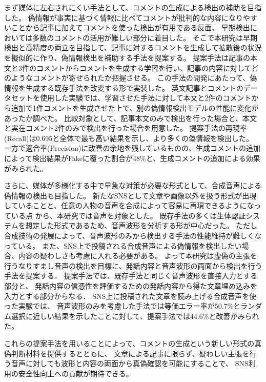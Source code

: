 まず媒体に左右されにくい手法として、コメントの生成による検出の補助を目指した。
偽情報が事実に基づく情報に比べてコメントが批判的な内容になりやすいことから記事に加えてコメントを使った検出が有用である反面、
早期検出においては多数のコメントの活用が難しい部分に着目した。
そこで本研究は早期検出と高精度の両立を目指して、記事に対するコメントを生成して拡散後の状況を擬似的に作り、偽情報検出を補助する手法を提案する。
提案手法は記事の本文と3件のコメントからコメントを生成する学習を行い、記事の内容に対してどのようなコメントが寄せられたか把握させる。
この手法の開発にあたって、偽情報を生成する既存手法を改変する形で実装した。
英文記事とコメントのデータセットを使用した実験では、学習させた手法に対して本文と2件のコメントから追加で1件コメントを生成させた上で、別の偽情報検出モデルの性能に変化があったか調べた。
比較対象として、記事本文のみで検出を行った場合と、本文と実在コメント2件のみで検出を行った場合を用意した。
提案手法の再現率(Recall)は0.695と全体で最も高い結果を示し、より多くの偽情報を検出した。
一方で適合率(Precision)に改善の余地を残しているものの、生成コメントの追加によって検出結果がFakeに覆った割合が48\%と、生成コメントの追加による効果がみられた。

さらに、媒体が多様化する中で早急な対策が必要な形式として、合成音声による偽情報の検出も目指した。
新たなSNSとして文章や画像以外を扱う形式が出現していることと、任意の人物の音声を合成によって容易に再現できるようになっている点
から、本研究では音声を対象とした。
既存手法の多くは生体認証システムを想定した形式であるため、音声波形を分析する形が中心だった。
ただし合成技術の発展によって、音声波形のみから検出する手法の性能維持が難しくなっている。
また、SNS上で投稿される合成音声による偽情報を検出したい場合、内容の疑わしさも考慮に入れる必要がある。
よって本研究は虚偽の主張を行うなりすまし音声の検出を目標に、発話内容と音声波形の両面から検出を行う手法を提案する．
提案手法では、既存手法と同じく音声波形を直接入力とする部分と、
発話内容の信憑性を評価するための発話内容から得た文章埋め込みを入力とする部分からなる．
SNS上に投稿された文章を読み上げる合成音声を使った実験では、
音声波形のみを考慮した手法では等価エラー率が50.7\%とランダム選択に近しい結果を示したことに対して、提案手法では44.6\%と改善がみられた。

これらの提案手法を用いることによって、コメントの生成という新しい形式の真偽判断材料を提供するとともに、
文章による記事に限らず、疑わしい主張を行う音声に対しても波形と内容の両面から真偽確認を可能にすることで、
SNS利用の安全性向上への貢献が期待できる。

%

\cleardoublepage